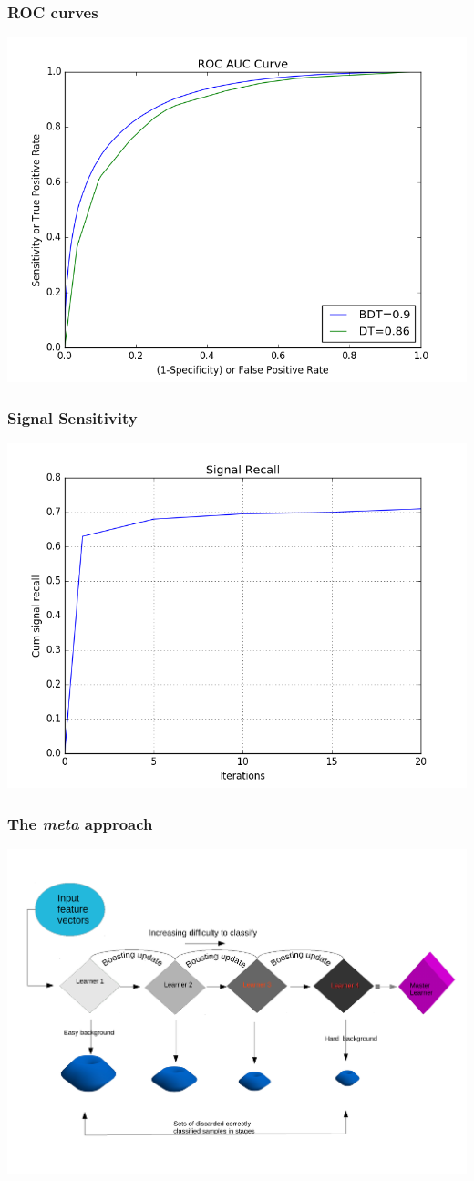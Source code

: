 \documentclass[pdf]{beamer}
\begin{document}
\begin{frame}
\frametitle{ROC curves}
\includegraphics[scale=0.5]{roc.png}
\end{frame}

\begin{frame}
\frametitle{Signal Sensitivity}
\includegraphics[scale=0.5]{sr.png}
\end{frame}

\begin{frame}
\frametitle{The \textit{meta} approach}
\includegraphics[scale=0.4]{MB.pdf}
\end{frame}
\end{document}
